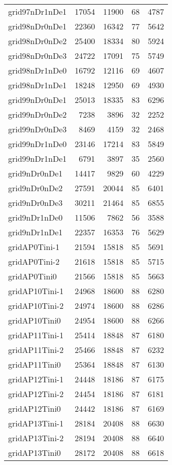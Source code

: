 \begin{tabular}{lrrrr}
grid97nDr1nDe1 & 17054 & 11900 & 68 & 4787 \\
grid98nDr0nDe1 & 22360 & 16342 & 77 & 5642 \\
grid98nDr0nDe2 & 25400 & 18334 & 80 & 5924 \\
grid98nDr0nDe3 & 24722 & 17091 & 75 & 5749 \\
grid98nDr1nDe0 & 16792 & 12116 & 69 & 4607 \\
grid98nDr1nDe1 & 18248 & 12950 & 69 & 4930 \\
grid99nDr0nDe1 & 25013 & 18335 & 83 & 6296 \\
grid99nDr0nDe2 & 7238 & 3896 & 32 & 2252 \\
grid99nDr0nDe3 & 8469 & 4159 & 32 & 2468 \\
grid99nDr1nDe0 & 23146 & 17214 & 83 & 5849 \\
grid99nDr1nDe1 & 6791 & 3897 & 35 & 2560 \\
grid9nDr0nDe1 & 14417 & 9829 & 60 & 4229 \\
grid9nDr0nDe2 & 27591 & 20044 & 85 & 6401 \\
grid9nDr0nDe3 & 30211 & 21464 & 85 & 6855 \\
grid9nDr1nDe0 & 11506 & 7862 & 56 & 3588 \\
grid9nDr1nDe1 & 22357 & 16353 & 76 & 5629 \\
gridAP0Tini-1 & 21594 & 15818 & 85 & 5691 \\
gridAP0Tini-2 & 21618 & 15818 & 85 & 5715 \\
gridAP0Tini0 & 21566 & 15818 & 85 & 5663 \\
gridAP10Tini-1 & 24968 & 18600 & 88 & 6280 \\
gridAP10Tini-2 & 24974 & 18600 & 88 & 6286 \\
gridAP10Tini0 & 24954 & 18600 & 88 & 6266 \\
gridAP11Tini-1 & 25414 & 18848 & 87 & 6180 \\
gridAP11Tini-2 & 25466 & 18848 & 87 & 6232 \\
gridAP11Tini0 & 25364 & 18848 & 87 & 6130 \\
gridAP12Tini-1 & 24448 & 18186 & 87 & 6175 \\
gridAP12Tini-2 & 24454 & 18186 & 87 & 6181 \\
gridAP12Tini0 & 24442 & 18186 & 87 & 6169 \\
gridAP13Tini-1 & 28184 & 20408 & 88 & 6630 \\
gridAP13Tini-2 & 28194 & 20408 & 88 & 6640 \\
gridAP13Tini0 & 28172 & 20408 & 88 & 6618 \\

\end{tabular}
